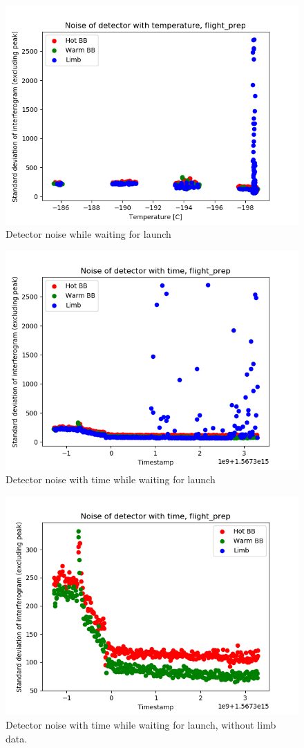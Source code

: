 \begin{figure}[ht]
  \centering
  \includegraphics[width=0.8\linewidth]{mct_noise_temp_plots/flight_prep_noisevstemp_invertedx_colours.png}
  \caption{Detector noise while waiting for launch}
  \label{fig:flightprep_noise}
\end{figure}

\begin{figure}[ht]
\centering
  \includegraphics[width=0.8\linewidth]{mct_noise_temp_plots/flight_prep_noisevstime_colours.png}
  \caption{Detector noise with time while waiting for launch}
  \label{fig:flightpreptime_noise}
\end{figure}

\begin{figure}[ht]
\centering
  \includegraphics[width=0.8\linewidth]{mct_noise_temp_plots/flight_prep_noisevstime_colours_no_limb.png}
  \caption{Detector noise with time while waiting for launch, without limb data.}
  \label{fig:flightpreptime_nolimb_noise}
\end{figure}

